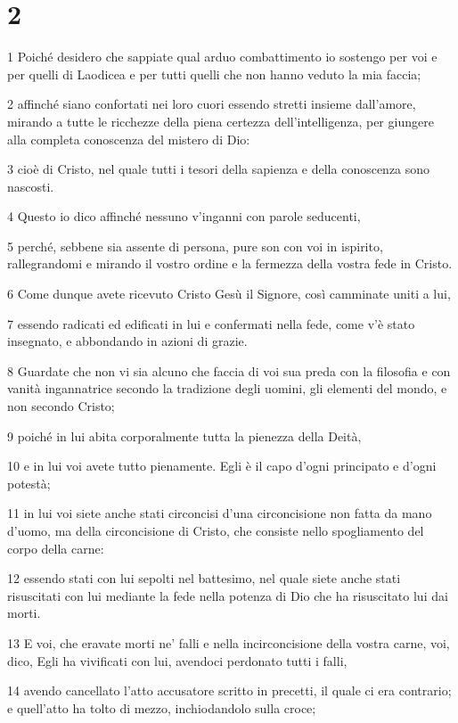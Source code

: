 \chapter{2}

\par 1 Poiché desidero che sappiate qual arduo combattimento io sostengo per voi e per quelli di Laodicea e per tutti quelli che non hanno veduto la mia faccia;
\par 2 affinché siano confortati nei loro cuori essendo stretti insieme dall'amore, mirando a tutte le ricchezze della piena certezza dell'intelligenza, per giungere alla completa conoscenza del mistero di Dio:
\par 3 cioè di Cristo, nel quale tutti i tesori della sapienza e della conoscenza sono nascosti.
\par 4 Questo io dico affinché nessuno v'inganni con parole seducenti,
\par 5 perché, sebbene sia assente di persona, pure son con voi in ispirito, rallegrandomi e mirando il vostro ordine e la fermezza della vostra fede in Cristo.
\par 6 Come dunque avete ricevuto Cristo Gesù il Signore, così camminate uniti a lui,
\par 7 essendo radicati ed edificati in lui e confermati nella fede, come v'è stato insegnato, e abbondando in azioni di grazie.
\par 8 Guardate che non vi sia alcuno che faccia di voi sua preda con la filosofia e con vanità ingannatrice secondo la tradizione degli uomini, gli elementi del mondo, e non secondo Cristo;
\par 9 poiché in lui abita corporalmente tutta la pienezza della Deità,
\par 10 e in lui voi avete tutto pienamente. Egli è il capo d'ogni principato e d'ogni potestà;
\par 11 in lui voi siete anche stati circoncisi d'una circoncisione non fatta da mano d'uomo, ma della circoncisione di Cristo, che consiste nello spogliamento del corpo della carne:
\par 12 essendo stati con lui sepolti nel battesimo, nel quale siete anche stati risuscitati con lui mediante la fede nella potenza di Dio che ha risuscitato lui dai morti.
\par 13 E voi, che eravate morti ne' falli e nella incirconcisione della vostra carne, voi, dico, Egli ha vivificati con lui, avendoci perdonato tutti i falli,
\par 14 avendo cancellato l'atto accusatore scritto in precetti, il quale ci era contrario; e quell'atto ha tolto di mezzo, inchiodandolo sulla croce;
